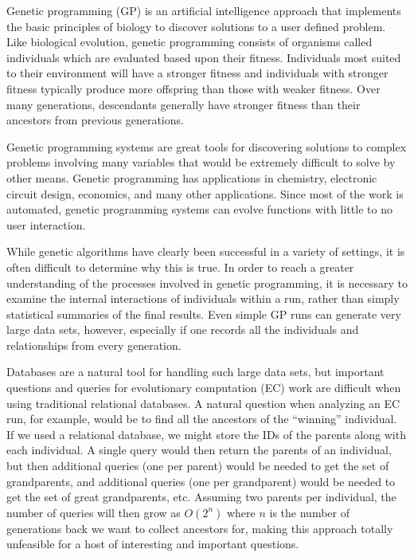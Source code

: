 \documentclass[12pt]{article}
\begin{document}
Genetic programming (GP) is an artificial intelligence approach that implements the basic principles of biology to discover solutions to a user defined problem. Like biological evolution, genetic programming consists of organisms called individuals which are evaluated based upon their fitness. Individuals most suited to their environment will have a stronger fitness and individuals with stronger fitness typically produce more offspring than those with weaker fitness. Over many generations, descendants generally have stronger fitness than their ancestors from previous generations. 



Genetic programming systems are great tools for discovering solutions to complex problems involving many variables that would be extremely difficult to solve by other means. Genetic programming has applications in chemistry, electronic circuit design, economics, and many other applications. Since most of the work is automated, genetic programming systems can evolve functions with little to no user interaction.

While genetic algorithms have clearly been successful in a variety of settings, it is often difficult to determine why this is true. In order to reach a greater understanding of the processes involved in genetic programming, it is necessary to examine the internal interactions of individuals within a run, rather than simply statistical summaries of the final results. Even simple GP runs can generate very large data sets, however, especially if one records all the individuals and relationships from every generation. 

Databases are a natural tool for handling such large data sets, but important questions and queries for evolutionary computation (EC) work are difficult when using traditional relational databases. A natural question when analyzing an EC run, for example, would be to find all the ancestors of the ``winning'' individual. If we used a relational database, we might store the IDs of the parents along with each individual. A single query would then return the parents of an individual, but then additional queries (one per parent) would be needed to get the set of grandparents, and additional queries (one per grandparent) would be needed to get the set of great grandparents, etc. Assuming two parents per individual, the number of queries will then grow as $O(2^n)$ where $n$ is the number of generations back we want to collect ancestors for, making this approach totally unfeasible for a host of interesting and important questions.
\end{document}
